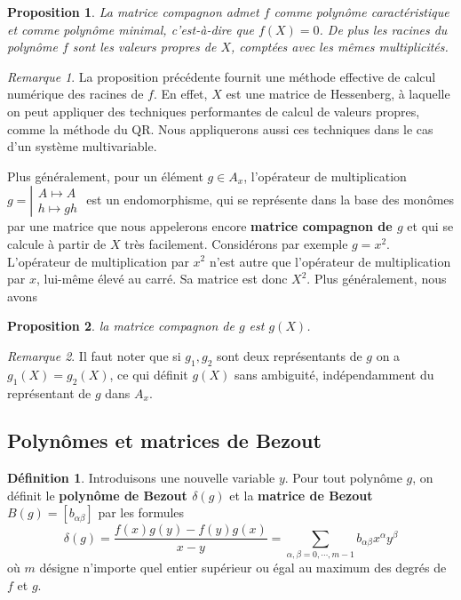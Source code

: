 \documentclass{article}
\theoremstyle{plain}%
\newtheorem{prop}{Proposition}
\theoremstyle{definition}
\newtheorem{defn}{Définition}
\theoremstyle{remark}
\newtheorem*{rem}{Remarque}
\begin{document}
\begin{prop}
\label{compan2roots}
La matrice compagnon admet $f$ comme polynôme caractéristique et comme polynôme minimal, c'est-à-dire que $f(X) = 0$. De plus les racines du polynôme $f$ sont les valeurs propres de $X$, comptées avec les mêmes multiplicités.
\end{prop}

\begin{rem}
La proposition précédente fournit une méthode effective de calcul numérique des racines de $f$. En effet, $X$ est une matrice de Hessenberg, à laquelle on peut appliquer des techniques performantes de calcul de valeurs propres, comme la méthode du QR. Nous appliquerons aussi ces techniques dans le cas d'un système multivariable.
\end{rem}
Plus généralement, pour un élément $g\in A_x$, l'opérateur de multiplication
$g = \left\vert
\begin{array}{c}
A \mapsto A \\
h \mapsto gh
\end{array}
\right.$
est un endomorphisme, qui se représente dans la base des monômes par une matrice que nous appelerons encore {\bf matrice compagnon de $g$} et qui se calcule à partir de $X$ très facilement. Considérons par exemple $g = x^2$. L'opérateur de multiplication par $x^2$ n'est autre que l'opérateur de multiplication par $x$, lui-même élevé au carré. Sa matrice est donc $X^2$. Plus généralement, nous avons
\begin{prop}
la matrice compagnon de $g$ est $g(X)$.
\end{prop}

\begin{rem}
Il faut noter que si $g_1, g_2$ sont deux représentants de $g$ on a $g_1(X) = g_2(X)$, ce qui définit $g(X)$ sans ambiguité, indépendamment du représentant de $g$ dans $A_x$.
\end{rem}

\subsection{Polynômes et matrices de Bezout}
\begin{defn}
\label{def_bez}
Introduisons une nouvelle variable $y$.
Pour tout polynôme $g$, on définit le {\bf polynôme de Bezout $\delta(g)$} et la {\bf matrice de Bezout $B(g) = [b_{\alpha\beta}]$}  par les formules
\begin{equation}
\delta(g) = \dfrac{f(x)g(y)-f(y)g(x)}{x-y} = \sum_{\alpha,\beta = 0, \cdots, m-1} b_{\alpha\beta} x^\alpha y^\beta
\end{equation}
où $m$ désigne n'importe quel entier supérieur ou égal au maximum des degrés de $f$ et $g$.
\end{defn}
\end{document}
